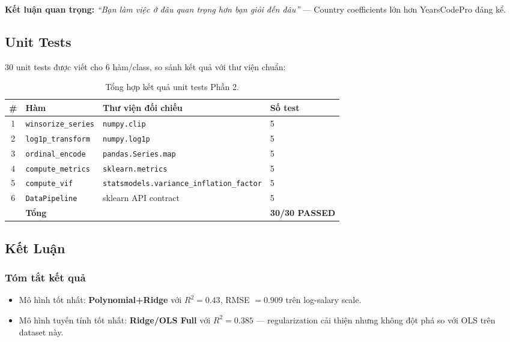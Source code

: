 \noindent\textbf{Kết luận quan trọng:} \textit{``Bạn làm việc ở đâu quan trọng hơn
bạn giỏi đến đâu''} — Country coefficients lớn hơn YearsCodePro đáng kể.

\subsection{Unit Tests}

30 unit tests được viết cho 6 hàm/class, so sánh kết quả với thư viện chuẩn:

\begin{table}[H]
\centering
\begin{tabular}{clll}
\toprule
\textbf{\#} & \textbf{Hàm} & \textbf{Thư viện đối chiếu} & \textbf{Số test} \\
\midrule
1 & \texttt{winsorize\_series} & \texttt{numpy.clip} & 5 \\
2 & \texttt{log1p\_transform} & \texttt{numpy.log1p} & 5 \\
3 & \texttt{ordinal\_encode} & \texttt{pandas.Series.map} & 5 \\
4 & \texttt{compute\_metrics} & \texttt{sklearn.metrics} & 5 \\
5 & \texttt{compute\_vif} & \texttt{statsmodels.variance\_inflation\_factor} & 5 \\
6 & \texttt{DataPipeline} & sklearn API contract & 5 \\
\midrule
 & \textbf{Tổng} & & \textbf{30/30 PASSED} \\
\bottomrule
\end{tabular}
\caption{Tổng hợp kết quả unit tests Phần 2.}
\end{table}

\subsection{Kết Luận}

\subsubsection{Tóm tắt kết quả}

\begin{itemize}
    \item Mô hình tốt nhất: \textbf{Polynomial+Ridge} với $R^2 = 0.43$,
        RMSE $= 0.909$ trên log-salary scale.
    \item Mô hình tuyến tính tốt nhất: \textbf{Ridge/OLS Full} với $R^2 = 0.385$ —
        regularization cải thiện nhưng không đột phá so với OLS trên dataset này.
\end{itemize}

